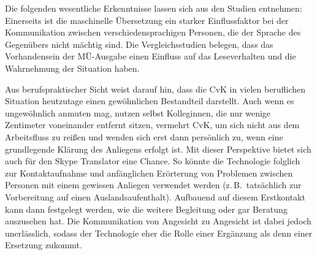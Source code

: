 Die folgenden wesentliche Erkenntnisse lassen sich aus den Studien entnehmen: Einerseits ist die maschinelle Übersetzung ein starker Einflussfaktor bei der Kommunikation zwischen verschiedensprachigen Personen, die der Sprache des Gegenübers nicht mächtig sind. Die Vergleichsstudien belegen, dass das Vorhandensein der MÜ-Ausgabe einen Einfluss auf das Leseverhalten und die Wahrnehmung der Situation haben. 

Aus berufspraktischer Sicht weist \citet[214\psq]{beiswenger_analyse_2017} darauf hin, dass die CvK in vielen beruflichen Situation heutzutage einen gewöhnlichen Bestandteil darstellt. Auch wenn es ungewöhnlich anmuten mag, nutzen selbst Kolleg{\textperiodcentered}\linebreak[3]innen, die nur wenige Zentimeter voneinander entfernt sitzen, vermehrt CvK, um sich nicht aus dem Arbeitsfluss zu reißen und wenden sich erst dann persönlich zu, wenn eine grundlegende Klärung des Anliegens erfolgt ist. Mit dieser Perspektive bietet sich auch für den Skype Translator eine Chance. So könnte die Technologie folglich zur Kontaktaufnahme und anfänglichen Erörterung von Problemen zwischen Personen mit einem gewissen Anliegen verwendet werden (z.\,B.\ tatsächlich zur Vorbereitung auf einen Auslandsaufenthalt). Aufbauend auf diesem Erstkontakt kann dann festgelegt werden, wie die weitere Begleitung oder gar Beratung auszusehen hat. Die Kommunikation von Angesicht zu Angesicht ist dabei jedoch unerlässlich, sodass der Technologie eher die Rolle einer Ergänzung als denn einer Ersetzung zukommt.
